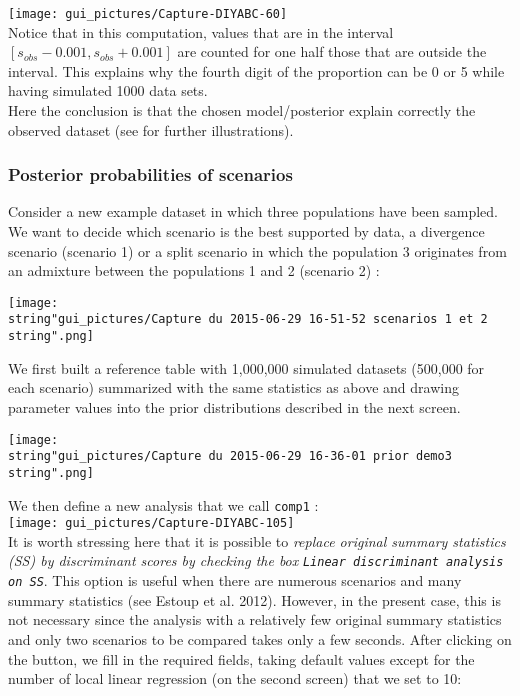 \texttt{[image: gui\_pictures/Capture-DIYABC-60]} \\


Notice that in this computation, values that are in the interval $[s_{obs}-0.001,s_{obs}+0.001]$
are counted for one half those that are outside the interval. This
explains why the fourth digit of the proportion can be 0 or 5 while
having simulated 1000 data sets.\\
 Here the conclusion is that the chosen model/posterior explain correctly
the observed dataset (see \citet{C2010} for further illustrations).


\subsubsection{Posterior probabilities of scenarios}

Consider a new example dataset in which three populations have been
sampled. We want to decide which scenario is the best supported by
data, a divergence scenario (scenario 1) or a split scenario in which
the population 3 originates from an admixture between the populations
1 and 2 (scenario 2) :

\texttt{[image: \\string"gui\_pictures/Capture du 2015-06-29 16-51-52 scenarios 1 et 2\\string".png]}

We first built a reference table with 1,000,000 simulated datasets
(500,000 for each scenario) summarized with the same statistics as
above and drawing parameter values into the prior distributions described
in the next screen.

\texttt{[image: \\string"gui\_pictures/Capture du 2015-06-29 16-36-01 prior demo3\\string".png]}

We then define a new analysis that we call \texttt{comp1} :\\


\texttt{[image: gui\_pictures/Capture-DIYABC-105]} \\


It is worth stressing here that it is possible to \emph{replace original
summary statistics (SS) by discriminant scores by checking the box
}\texttt{\emph{Linear discriminant analysis on SS}}. This option is
useful when there are numerous scenarios and many summary statistics
(see Estoup et al. 2012). However, in the present case, this is not
necessary since the analysis with a relatively few original summary
statistics and only two scenarios to be compared takes only a few
seconds. After clicking on the  button,
we fill in the required fields, taking default values except for the
number of local linear regression (on the second screen) that we set
to 10:\\


